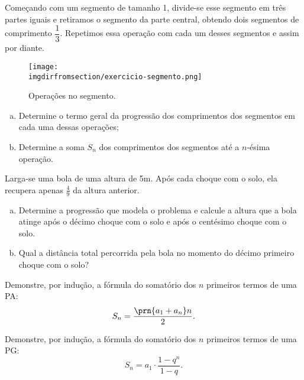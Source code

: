 \begin{exercise}
    Começando com um segmento de tamanho 1, divide-se esse segmento em três partes iguais e retiramos o segmento da parte central, obtendo dois segmentos de comprimento $\dfrac 1 3$. Repetimos essa operação com cada um desses segmentos e assim por diante.
    \begin{figure}[H]
        \centering
        \label{fig:exercicio-segmento}
        \texttt{[image: \\imgdirfromsection/exercicio-segmento.png]}
	\caption{Operações no segmento.}
    \end{figure}
    \begin{enumerate}[a)]
	\item Determine o termo geral da progressão dos comprimentos dos segmentos em cada uma dessas operações;
	\item Determine a soma $S_n$ dos comprimentos dos segmentos até a $n$-ésima operação.
    \end{enumerate}
\end{exercise}

\begin{exercise}
    Larga-se uma bola de uma altura de 5m. Após cada choque com o
solo, ela recupera apenas $\frac 4 9 $ da altura anterior. 
%
\begin{enumerate}[a)]
    \item Determine a progressão que modela o problema e calcule 
    a altura que a bola atinge após o décimo choque com o solo
    e após o centésimo choque com o solo.
    \item Qual a distância total percorrida pela bola no momento 
    do décimo primeiro choque com o solo? 
\end{enumerate}
\end{exercise}

\begin{exercise}
	Demonstre, por indução, a fórmula do somatório dos $n$ primeiros termos de uma PA:
	\[S_n = \frac {\prn {a_1+a_n}n} 2.\]
\end{exercise}

\begin{exercise}
	Demonstre, por indução, a fórmula do somatório dos $n$ primeiros termos de uma PG:
	\[S_n = a_1 \cdot \frac{1-q^n}{1-q}.\]
\end{exercise}


